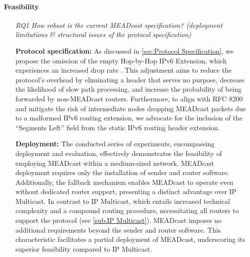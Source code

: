 \paragraph{Feasibility} %
\label{par:discussion_Feasibility}
\begin{itemize}
\item[\textit{RQ1}]
    \textit{How robust is the current MEADcast specification? (deployment
        limitations \& structural issues of the protocol specification)}\par
    \textbf{Protocol specification:}
    As discussed in \autoref{sec:Protocol Specification}, we propose the
        omission of the empty Hop-by-Hop IPv6 Extension, which experiences an
        increased drop rate \cite{rfc7872_ext_hdrs_drop_rate}.
    This adjustment aims to reduce the protocol's overhead by eliminating a
        header that serves no purpose, decrease the likelihood of slow path
        processing, and increase the probability of being forwarded by
        non-MEADcast routers.
    Furthermore, to align with RFC 8200 \cite{rfc8200_ipv6_hdr} and mitigate
        the risk of intermediate nodes dropping MEADcast packets due to a
        malformed IPv6 routing extension, we advocate for the inclusion of the
        ``Segments Left'' field from the static IPv6 routing header extension.

    \textbf{Deployment:}
    The conducted series of experiments, encompassing deployment and evaluation,
        effectively demonstrates the feasibility of employing MEADcast within a
        medium-sized network.
    MEADcast deployment requires only the installation of sender and router
        software.
    Additionally, the fallback mechanism enables MEADcast to operate even
        without dedicated router support, presenting a distinct advantage over
        IP Multicast.
    In contrast to IP Multicast, which entails increased technical complexity
        and a compound routing procedure, necessitating all routers to support
        the protocol (see \autoref{sub:IP Multicast}), MEADcast imposes no
        additional requirements beyond the sender and router software.
    This characteristic facilitates a partial deployment of MEADcast,
        underscoring its superior feasibility compared to IP Multicast.


\end{itemize}
